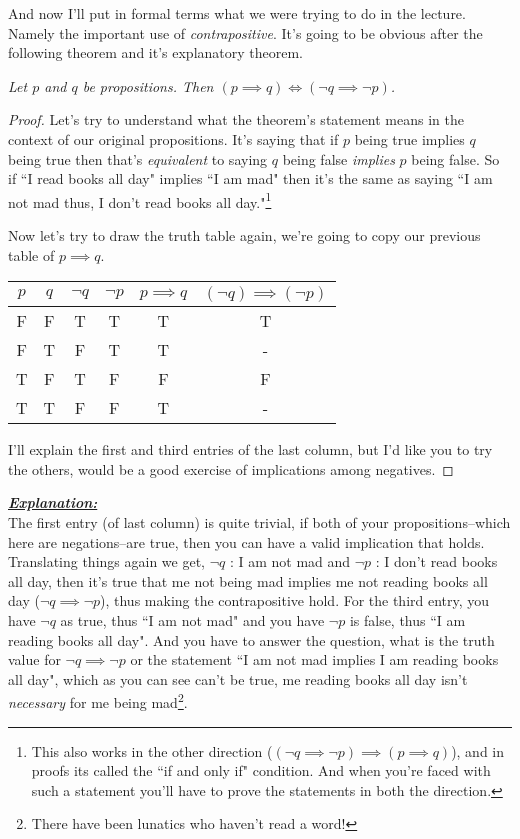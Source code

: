 \documentclass[a4paper]{article}
\begin{document}
And now I'll put in formal terms what we were trying to do in the lecture. Namely the important use of \textit{contrapositive}. It's going to be obvious after the following theorem and it's explanatory theorem.

\begin{theorem}
\textit{
Let $p$ and $q$ be propositions. Then $(p \implies q) \iff (\neg q \implies \neg p)$.
}
\end{theorem}

\begin{Proof}
	\begin{proof}
	Let's try to understand what the theorem's statement means in the context of our original propositions. It's saying that if $p$ being true implies $q$ being true then that's \textit{equivalent} to saying $q$ being false \textit{implies} $p$ being false. So if ``I read books all day" implies ``I am mad" then it's the same as saying ``I am not mad thus, I don't read books all day."\footnote{This also works in the other direction ($(\neg q \implies \neg p) \implies (p \implies q)$), and in proofs its called the ``if and only if" condition. And when you're faced with such a statement you'll have to prove the statements in both the direction.}

	Now let's try to draw the truth table again, we're going to copy our previous table of $p \implies q$. 
	\begin{center}
		\begin{tabular}{c|c||c|c|c|c}
			$p$ & $q$ & $\neg q$ & $\neg p$ & $p \implies q$ & $(\neg q) \implies (\neg p)$ \\
			\hline
			F & F & T & T & T & T \\
			F & T & F & T & T & - \\
			T & F & T & F & F & F \\
			T & T & F & F & T & - \\
		\end{tabular}
	\end{center}
	I'll explain the first and third entries of the last column, but I'd like you to try the others, would be a good exercise of implications among negatives. 
\end{proof}
	\vspace{2.5mm}
	\textbf{\textit{\underline{Explanation:}}} \\
	
The first entry (of last column) is quite trivial, if both of your propositions--which here are negations--are true, then you can have a valid implication that holds. Translating things again we get, $\neg q$ : I am not mad and $\neg p$ : I don't read books all day, then it's true that me not being mad implies me not reading books all day ($\neg q \implies \neg p$), thus making the contrapositive hold. For the third entry, you have $\neg q$ as true, thus ``I am not mad" and you have $\neg p$ is false, thus ``I am reading books all day". And you have to answer the question, what is the truth value for $\neg q \implies \neg p$ or the statement ``I am not mad implies I am reading books all day", which as you can see can't be true, me reading books all day isn't \textit{necessary} for me being mad\footnote{There have been lunatics who haven't read a word!}. 


\end{Proof}
\end{document}
